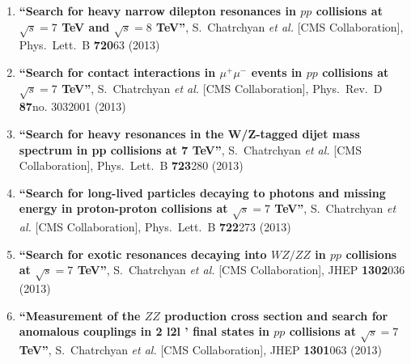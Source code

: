 \begin{enumerate}
\item%
{\bf ``Search for heavy narrow dilepton resonances in $pp$ collisions at $\sqrt{s}=7$ TeV and $\sqrt{s}=8$ TeV''}, 
  S.~Chatrchyan {\it et al.}  [CMS Collaboration], 
Phys.\ Lett.\ B {\bf 720}63 (2013) %


\item%
{\bf ``Search for contact interactions in $\mu^+\mu^-$ events in $pp$ collisions at $\sqrt{s}=7$ TeV''}, 
  S.~Chatrchyan {\it et al.}  [CMS Collaboration], 
Phys.\ Rev.\ D {\bf 87}no. 3032001 (2013) %


\item%
{\bf ``Search for heavy resonances in the W/Z-tagged dijet mass spectrum in pp collisions at 7 TeV''}, 
  S.~Chatrchyan {\it et al.}  [CMS Collaboration], 
Phys.\ Lett.\ B {\bf 723}280 (2013) %


\item%
{\bf ``Search for long-lived particles decaying to photons and missing energy in proton-proton collisions at $\sqrt{s}=7$ TeV''}, 
  S.~Chatrchyan {\it et al.}  [CMS Collaboration], 
Phys.\ Lett.\ B {\bf 722}273 (2013) %


\item%
{\bf ``Search for exotic resonances decaying into $WZ/ZZ$ in $pp$ collisions at $\sqrt{s}=7$ TeV''}, 
  S.~Chatrchyan {\it et al.}  [CMS Collaboration], 
JHEP {\bf 1302}036 (2013) %


\item%
{\bf ``Measurement of the $ZZ$ production cross section and search for anomalous couplings in 2 l2l ' final states in $pp$ collisions at $\sqrt{s}=7$ TeV''}, 
  S.~Chatrchyan {\it et al.}  [CMS Collaboration], 
JHEP {\bf 1301}063 (2013) %



\end{enumerate}
